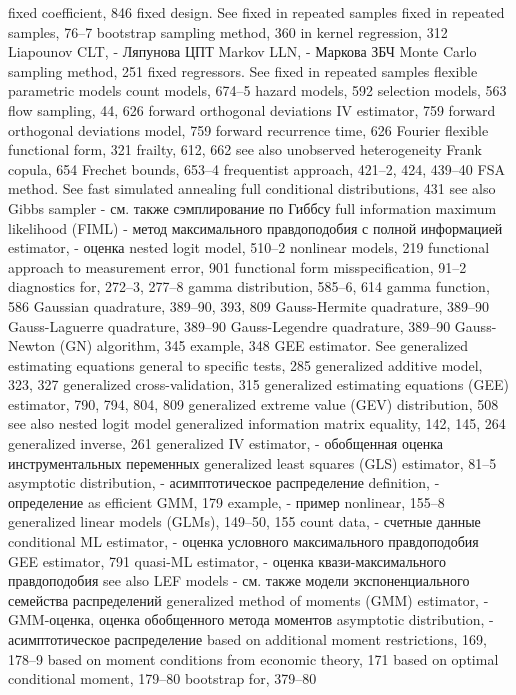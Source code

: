 fixed coefficient, 846
fixed design. See fixed in repeated samples fixed in repeated samples, 76–7
bootstrap sampling method, 360 
in kernel regression, 312 
Liapounov CLT, - Ляпунова ЦПТ
Markov LLN, - Маркова ЗБЧ
Monte Carlo sampling method, 251
fixed regressors. See fixed in repeated samples flexible parametric models
count models, 674–5 hazard models, 592 selection models, 563
flow sampling, 44, 626
forward orthogonal deviations IV estimator, 759 forward orthogonal deviations model, 759 forward recurrence time, 626
Fourier flexible functional form, 321
frailty, 612, 662
see also unobserved heterogeneity Frank copula, 654
Frechet bounds, 653–4
frequentist approach, 421–2, 424, 439–40 FSA method. See fast simulated annealing full conditional distributions, 431
see also Gibbs sampler - см. также сэмплирование по Гиббсу
full information maximum likelihood (FIML) - метод максимального правдоподобия с полной информацией
estimator, - оценка
nested logit model, 510–2 nonlinear models, 219
functional approach
to measurement error, 901
functional form misspecification, 91–2 diagnostics for, 272–3, 277–8
gamma distribution, 585–6, 614 gamma function, 586
Gaussian quadrature, 389–90, 393, 809 Gauss-Hermite quadrature, 389–90 Gauss-Laguerre quadrature, 389–90 Gauss-Legendre quadrature, 389–90
Gauss-Newton (GN) algorithm, 345 example, 348
GEE estimator. See generalized estimating equations general to specific tests, 285
generalized additive model, 323, 327
generalized cross-validation, 315
generalized estimating equations (GEE) estimator, 790, 794, 804, 809
generalized extreme value (GEV) distribution, 508 see also nested logit model
generalized information matrix equality, 142, 145, 264 generalized inverse, 261
generalized IV estimator, - обобщенная оценка инструментальных переменных
generalized least squares (GLS) estimator, 81–5
asymptotic distribution, - асимптотическое распределение 
definition, - определение
as efficient GMM, 179 
example, - пример
nonlinear, 155–8
generalized linear models (GLMs), 149–50, 155
count data, - счетные данные
conditional ML estimator, - оценка условного максимального правдоподобия 
GEE estimator, 791
quasi-ML estimator, - оценка квази-максимального правдоподобия 
see also LEF models - см. также модели экспоненциального семейства распределений
generalized method of moments (GMM) estimator, - GMM-оценка, оценка обобщенного метода моментов
asymptotic distribution, - асимптотическое распределение
based on additional moment restrictions, 169,
178–9
based on moment conditions from economic theory,
171
based on optimal conditional moment, 179–80 bootstrap for, 379–80
